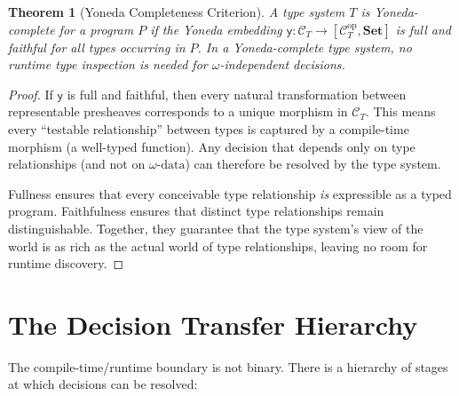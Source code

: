 \documentclass[11pt]{article}
\newtheorem{theorem}{Theorem}[section]
\newcommand{\omegadata}{\omega\text{-data}}
\newcommand{\Set}{\mathbf{Set}}
\begin{document}
\begin{theorem}[Yoneda Completeness Criterion]
\label{thm:yoneda-complete}
A type system $T$ is \emph{Yoneda-complete} for a program $P$ if the Yoneda embedding
$\mathsf{y} : \mathcal{C}_T \to [\mathcal{C}_T^{\mathrm{op}}, \Set]$ is full and
faithful for all types occurring in $P$. In a Yoneda-complete type system, no runtime
type inspection is needed for $\omega$-independent decisions.
\end{theorem}

\begin{proof}
If $\mathsf{y}$ is full and faithful, then every natural transformation between
representable presheaves corresponds to a unique morphism in $\mathcal{C}_T$. This
means every ``testable relationship'' between types is captured by a compile-time
morphism (a well-typed function). Any decision that depends only on type relationships
(and not on $\omegadata$) can therefore be resolved by the type system.

Fullness ensures that every conceivable type relationship \emph{is} expressible as a
typed program. Faithfulness ensures that distinct type relationships remain
distinguishable. Together, they guarantee that the type system's view of the world is
as rich as the actual world of type relationships, leaving no room for runtime
discovery.
\end{proof}


\section{The Decision Transfer Hierarchy}
\label{sec:hierarchy}

The compile-time/runtime boundary is not binary. There is a hierarchy of stages at
which decisions can be resolved:

\begin{center}
\end{center}
\end{document}
